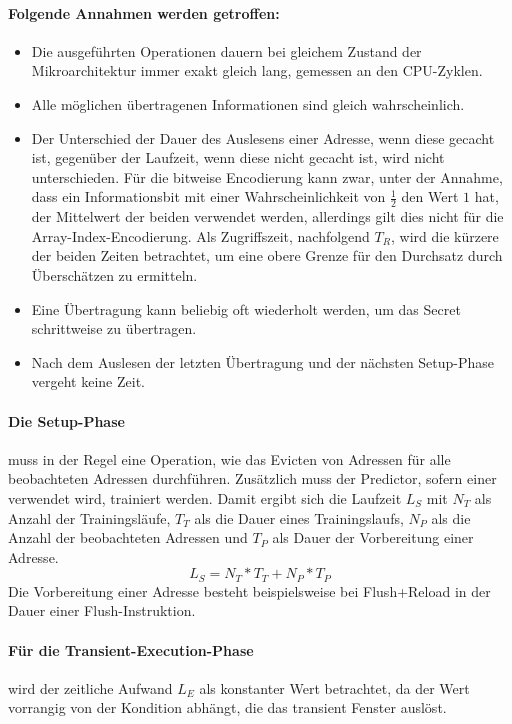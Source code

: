 \paragraph{Folgende Annahmen werden getroffen:}
\begin{itemize}
    \item Die ausgeführten Operationen dauern bei gleichem
    Zustand der Mikroarchitektur immer exakt gleich
    lang, gemessen an den \ac{CPU}-Zyklen.
    \item Alle möglichen übertragenen Informationen
    sind gleich wahrscheinlich.
    \item Der Unterschied der Dauer des Auslesens einer Adresse,
    wenn diese gecacht ist, gegenüber der Laufzeit, wenn diese
    nicht gecacht ist, wird nicht unterschieden. Für die
    bitweise Encodierung kann zwar, unter der Annahme, dass ein
    Informationsbit mit einer Wahrscheinlichkeit von
    $\frac{1}{2}$ den Wert $1$ hat, der Mittelwert der beiden
    verwendet werden, allerdings gilt dies nicht für die
    Array-Index-Encodierung. Als Zugriffszeit, nachfolgend $T_R$,
    wird die kürzere der beiden Zeiten betrachtet, um eine obere
    Grenze für den Durchsatz durch Überschätzen zu ermitteln.
    \item Eine Übertragung kann beliebig oft wiederholt werden,
    um das Secret schrittweise zu übertragen.
    \item Nach dem Auslesen der letzten Übertragung
    und der nächsten Setup-Phase vergeht keine Zeit.
\end{itemize}

\paragraph{Die Setup-Phase}
muss in der Regel eine Operation, wie das Evicten von
Adressen für alle beobachteten Adressen durchführen.
Zusätzlich muss der Predictor, sofern einer verwendet wird,
trainiert werden. Damit ergibt sich die Laufzeit $L_S$
mit $N_T$ als Anzahl der Trainingsläufe, $T_T$ als die
Dauer eines Trainingslaufs, $N_P$ als die Anzahl der beobachteten
Adressen und $T_P$ als Dauer der Vorbereitung einer Adresse.
\[L_S=N_T*T_T+N_P*T_P\]
Die Vorbereitung einer Adresse besteht beispielsweise bei
Flush+Reload in der Dauer einer Flush-Instruktion.

\paragraph{Für die Transient-Execution-Phase}
wird der zeitliche Aufwand $L_E$ als konstanter Wert betrachtet,
da der Wert vorrangig von der Kondition abhängt, die das transient
Fenster auslöst.

